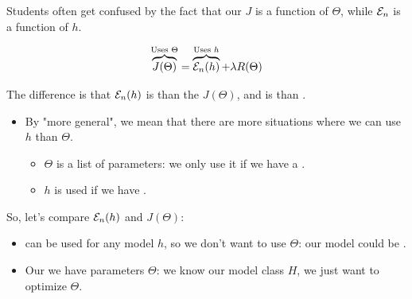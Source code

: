         \begin{clarification}
           Students often get confused by the fact that our  $J$ is a function of $\Theta$, while  $\mathcal{E}_n$ is a function of $h$.

           \begin{equation*}
               \overbrace{
                    J(\Theta)}^{\text{Uses } \Theta} 
                =
                \overbrace{
                    \mathcal{E}_n(h)}^{\text{Uses } h} 
                + \lambda R(\Theta)
           \end{equation*}
            
            The difference is that  $\mathcal{E}_n(h)$ is  than the  $J(\Theta)$, and  is  than \purp{$\Theta$}.

            \begin{itemize}
                \item By "more general", we mean that there are more situations where we can use $h$ than $\Theta$.
                \begin{itemize}
                    \item $\Theta$ is a list of parameters: we only use it if we have a .
                    \item $h$ is used if we have .
                \end{itemize}
            \end{itemize}

            
            So, let's compare $\mathcal{E}_n(h)$ and $J(\Theta)$:
            
            \begin{itemize}
                \item {} 
                can be used for any model $h$, so we don't want to use $\Theta$: our model could be .
                
                \item Our   we have parameters $\Theta$: we know our model class $H$, we just want to optimize $\Theta$.
            \end{itemize}
            
        \end{clarification}
        
    \pagebreak
        
